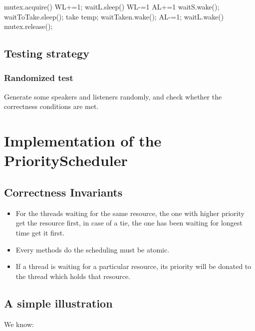 \documentclass{article}
\begin{document}
	\begin{algorithm}[H]
		\begin{algorithmic}
				\State mutex.acquire()
				\State WL+=1;
				\State waitL.sleep()
				\State WL-=1
			\EndWhile
			\State AL+=1
			\If{WS $>$ 0}
				\State waitS.wake();
			\EndIf
			\State waitToTake.sleep();
			\State take temp;
			\State waitTaken.wake();
			\State AL-=1;
				\State waitL.wake()
			\EndIf
			\State mutex.release();
			\EndProcedure
		\end{algorithmic}
	\end{algorithm}
	
	\subsection{Testing strategy}
	
	\subsubsection*{Randomized test}
	Generate some speakers and listeners randomly, and check whether the correctness conditions are met.
%	
	\section{Implementation of the PriorityScheduler}
	
	\subsection{Correctness Invariants}
	
	\begin{itemize}
		\item For the threads waiting for the same resource, the one with higher priority get the resource first, in case of a tie, the one has been waiting for longest time get it first.
		
		\item Every methods do the scheduling must be atomic.
		
		\item If a thread is waiting for a particular resource, its priority will be donated to the thread which holds that resource.
	\end{itemize}
	
	\subsection{A simple illustration}
	We know:
	
\end{document}
